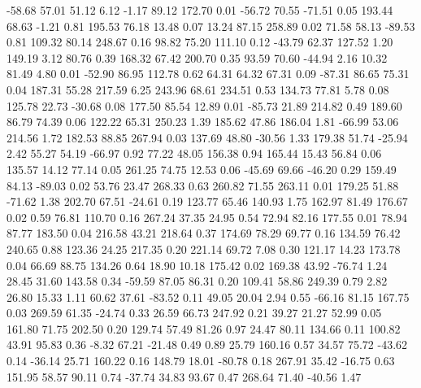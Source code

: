   -58.68   57.01   51.12    6.12
   -1.17   89.12  172.70    0.01
  -56.72   70.55  -71.51    0.05
  193.44   68.63   -1.21    0.81
  195.53   76.18   13.48    0.07
   13.24   87.15  258.89    0.02
   71.58   58.13  -89.53    0.81
  109.32   80.14  248.67    0.16
   98.82   75.20  111.10    0.12
  -43.79   62.37  127.52    1.20
  149.19    3.12   80.76    0.39
  168.32   67.42  200.70    0.35
   93.59   70.60  -44.94    2.16
   10.32   81.49    4.80    0.01
  -52.90   86.95  112.78    0.62
   64.31   64.32   67.31    0.09
  -87.31   86.65   75.31    0.04
  187.31   55.28  217.59    6.25
  243.96   68.61  234.51    0.53
  134.73   77.81    5.78    0.08
  125.78   22.73  -30.68    0.08
  177.50   85.54   12.89    0.01
  -85.73   21.89  214.82    0.49
  189.60   86.79   74.39    0.06
  122.22   65.31  250.23    1.39
  185.62   47.86  186.04    1.81
  -66.99   53.06  214.56    1.72
  182.53   88.85  267.94    0.03
  137.69   48.80  -30.56    1.33
  179.38   51.74  -25.94    2.42
   55.27   54.19  -66.97    0.92
   77.22   48.05  156.38    0.94
  165.44   15.43   56.84    0.06
  135.57   14.12   77.14    0.05
  261.25   74.75   12.53    0.06
  -45.69   69.66  -46.20    0.29
  159.49   84.13  -89.03    0.02
   53.76   23.47  268.33    0.63
  260.82   71.55  263.11    0.01
  179.25   51.88  -71.62    1.38
  202.70   67.51  -24.61    0.19
  123.77   65.46  140.93    1.75
  162.97   81.49  176.67    0.02
    0.59   76.81  110.70    0.16
  267.24   37.35   24.95    0.54
   72.94   82.16  177.55    0.01
   78.94   87.77  183.50    0.04
  216.58   43.21  218.64    0.37
  174.69   78.29   69.77    0.16
  134.59   76.42  240.65    0.88
  123.36   24.25  217.35    0.20
  221.14   69.72    7.08    0.30
  121.17   14.23  173.78    0.04
   66.69   88.75  134.26    0.64
   18.90   10.18  175.42    0.02
  169.38   43.92  -76.74    1.24
   28.45   31.60  143.58    0.34
  -59.59   87.05   86.31    0.20
  109.41   58.86  249.39    0.79
    2.82   26.80   15.33    1.11
   60.62   37.61  -83.52    0.11
   49.05   20.04    2.94    0.55
  -66.16   81.15  167.75    0.03
  269.59   61.35  -24.74    0.33
   26.59   66.73  247.92    0.21
   39.27   21.27   52.99    0.05
  161.80   71.75  202.50    0.20
  129.74   57.49   81.26    0.97
   24.47   80.11  134.66    0.11
  100.82   43.91   95.83    0.36
   -8.32   67.21  -21.48    0.49
    0.89   25.79  160.16    0.57
   34.57   75.72  -43.62    0.14
  -36.14   25.71  160.22    0.16
  148.79   18.01  -80.78    0.18
  267.91   35.42  -16.75    0.63
  151.95   58.57   90.11    0.74
  -37.74   34.83   93.67    0.47
  268.64   71.40  -40.56    1.47
